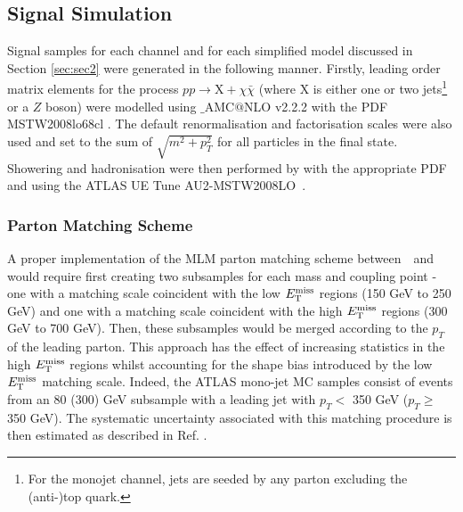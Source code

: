 \subsection{Signal Simulation}
\label{signal_generation}
Signal samples for each channel and for each simplified model discussed in Section \ref{sec:sec2} were generated in the following manner. Firstly, leading order matrix elements for the process $pp \rightarrow \mathrm{X} + \chi\bar{\chi}$ (where X is either one or two jets\footnote{For the monojet channel, jets are seeded by any parton excluding the (anti-)top quark.} or a $Z$ boson) were modelled using \MG$\_${\footnotesize A}MC$@$NLO v2.2.2 \cite{MG_aMCNLO2014} with the PDF MSTW2008lo68cl \cite{MSTW}. The default renormalisation and factorisation scales were also used and set to the sum of $\sqrt{m^{2} + p_{T}^{2}}$ for all particles in the final state. Showering and hadronisation were then performed by  with the appropriate PDF and using the ATLAS UE Tune AU2-MSTW2008LO~\cite{AUtune}.

{}

 
\subsubsection{Parton Matching Scheme}
A proper implementation of the MLM parton matching scheme between \MG$\mbox{ }$and \PYTHIA would require first creating two subsamples for each mass and coupling point - one with a matching scale coincident with the low $E_{\mathrm{T}}^{\mathrm{miss}}$ regions (150 GeV to 250 GeV) and one with a matching scale coincident with the high $E_{\mathrm{T}}^{\mathrm{miss}}$ regions (300 GeV to 700 GeV). Then, these subsamples would be merged according to the $p_{T}$ of the leading parton. This approach has the effect of increasing statistics in the high $E_{\mathrm{T}}^{\mathrm{miss}}$ regions whilst accounting for the shape bias introduced by the low $E_{\mathrm{T}}^{\mathrm{miss}}$ matching scale. Indeed, the ATLAS mono-jet MC samples consist of events from an 80 (300) GeV subsample with a leading jet with $p_{T} <$ 350 GeV ($p_{T} \geq$ 350 GeV). The systematic uncertainty associated with this matching procedure is then estimated as described in Ref. \cite{CERN-THESIS-2015-038}.
\bigskip

